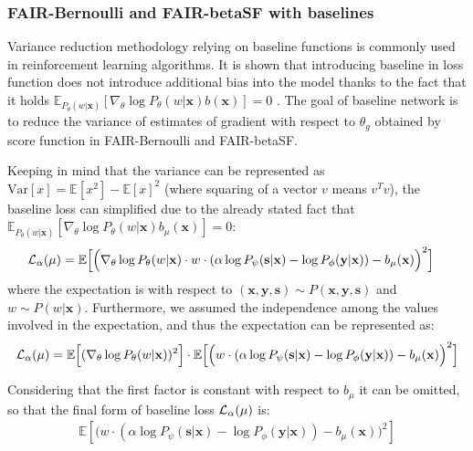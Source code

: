 \documentclass[preprint,12pt]{elsarticle}
\begin{document}
\subsubsection{FAIR-Bernoulli and FAIR-betaSF with baselines}
\label{app:baselines}

Variance reduction methodology relying on baseline functions is commonly used in reinforcement learning algorithms. It is shown that introducing baseline in loss function does not introduce additional bias into the model thanks to the fact that it holds $\mathbb{E}_{P_\theta(w|\mathbf{x})}[\nabla_{\theta}\log P_\theta(w|\mathbf{x}) b(\mathbf{x})]=0$ \cite{sutton2018reinforcement}.
The goal of baseline network is to reduce the variance of estimates of gradient with respect to $\theta_g$ obtained by score function in FAIR-Bernoulli and FAIR-betaSF.

Keeping in mind that the variance can be represented as $\mathrm{Var}[x] = \mathbb{E}[x^2] - \mathbb{E}[x]^2$ (where squaring of a vector $v$ means $v^Tv$), the baseline loss can simplified due to the already stated fact that
$\mathbb{E}_{P_\theta(w|\mathbf{x})}[\nabla_{\theta}\log P_\theta(w|\mathbf{x}) b_\mu(\mathbf{x})]=0$:
\begin{gather*}
	\begin{split}
	&{\cal L}_{\alpha}(\mu) = \mathbb{E} \Big[\Big(\nabla_{\theta}\log P_\theta(w|\mathbf{x}) \cdot w \cdot (\alpha \log P_\psi(\mathbf{s}|\mathbf{x}) - \log P_\phi(\mathbf{y}|\mathbf{x}))  - b_\mu(\mathbf{x})\Big)^2 \Big]
	\end{split}
\end{gather*}
where the expectation is with respect to $(\mathbf{x},\mathbf{y},\mathbf{s})\sim P(\mathbf{x},\mathbf{y},\mathbf{s})$ and $w\sim P(w|\mathbf{x})$.
Furthermore, we assumed the independence among the values involved in the expectation, and thus the expectation can be represented as:
\begin{equation*}
	\begin{split}
	{\cal L}_{\alpha}(\mu) = \mathbb{E} \Big[(\nabla_{\theta}\log P_\theta(w|\mathbf{x}))^2 \Big] \cdot \mathbb{E} \Big[ \Big(w \cdot (\alpha \log P_\psi(\mathbf{s}|\mathbf{x}) - \log P_\phi(\mathbf{y}|\mathbf{x})) - b_\mu(\mathbf{x})\Big)^2 \Big]
	\end{split}
\end{equation*}

Considering that the first factor is constant with respect to $b_\mu$ it can be omitted, so that the final form of baseline loss ${\cal L}_{\alpha}(\mu)$  is:
\begin{equation*}
\begin{split}
\mathbb{E} [\big(w \cdot (\alpha \log P_\psi(\mathbf{s}|\mathbf{x}) - \log P_\phi(\mathbf{y}|\mathbf{x})) - b_\mu(\mathbf{x})\big)^2]
\end{split}
\end{equation*}
\end{document}

